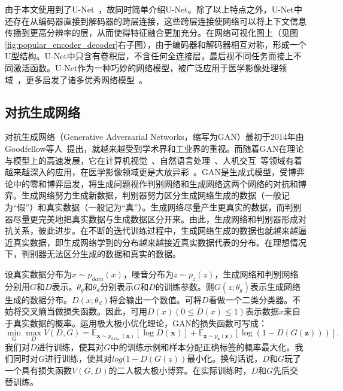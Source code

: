 由于本文使用到了U-Net~\cite{ronneberger2015u}，故同时简单介绍U-Net。除了以上特点之外，U-Net中还存在从编码器直接到解码器的跨层连接，这些跨层连接使网络可以将上下文信息传播到更高分辨率的层，从而使得特征融合更加充分。在网络可视化图上（见图\ref{fig:popular_encoder_decoder}右子图），由于编码器和解码器相互对称，形成一个U型结构。U-Net中只含有卷积层，不含任何全连接层，最后视不同任务而接上不同激活函数。U-Net作为一种巧妙的网络模型，被广泛应用于医学影像处理领域~\cite{cciccek20163d, han2018framing, dong2017automatic, sevastopolsky2017optic, zhang2018ct}，更多启发了诸多优秀网络模型~\cite{zhou2018unet++, oktay2018attention, ibtehaz2020multiresunet, alom2019recurrent, milletari2016v}。
\subsection{对抗生成网络}\label{subsec:gan_introduction}
对抗生成网络（Generative Adversarial Networks，缩写为GAN）最初于2014年由Goodfellow等人~\cite{goodfellow2014generative}提出，就越来越受到学术界和工业界的重视。而随着GAN在理论与模型上的高速发展，它在计算机视觉~\cite{zhu2017unpaired}、自然语言处理~\cite{qin2018dsgan}、人机交互~\cite{qiao2018emotional}等领域有着越来越深入的应用，在医学影像领域更是大放异彩~\cite{yang2017dagan, bhadra2020medical}。GAN是生成式模型，受博弈论中的零和博弈启发，将生成问题视作判别网络和生成网络这两个网络的对抗和博弈。生成网络努力生成新数据，判别器努力区分生成网络生成的数据（一般记为“假”）和真实数据（一般记为“真”）。生成网络尽量产生更真实的数据，而判别器尽量更完美地把真实数据与生成数据区分开来。由此，生成网络和判别器形成对抗关系，彼此进步。在不断的迭代训练过程中，生成网络生成的数据也就越来越逼近真实数据，即生成网络学到的分布越来越接近真实数据代表的分布。在理想情况下，判别器无法区分生成的数据和真实的数据。

设真实数据分布为$x\sim p_{data}(x)$，噪音分布为$z\sim p_z(z)$，生成网络和判别网络分别用$G$和$D$表示。$\theta_{g}$和$\theta_{d}$分别表示$G$和$D$的训练参数。则$G(z;\theta_{g})$表示生成网络生成的数据分布。$D(x;\theta_{d})$将会输出一个数值。可将$D$看做一个二类分类器。不妨将交叉熵当做损失函数。因此，可用$D(x)(0\leq D(x)\leq 1)$表示数据$x$来自于真实数据的概率。运用极大极小优化理论，GAN的损失函数可写成：
\begin{equation}\label{equ:gan_loss_func}
\min _{G} \max _{D} V(D, G)=\mathbb{E}_{\boldsymbol{x} \sim p_{\text {data }}(\boldsymbol{x})}[\log D(\boldsymbol{x})]+\mathbb{E}_{\boldsymbol{z} \sim p_{\boldsymbol{z}}(\boldsymbol{z})}[\log (1-D(G(\boldsymbol{z})))].
\end{equation}
我们对$D$进行训练，使其对$G$中的训练示例和样本分配正确标签的概率最大化。我们同时对$G$进行训练，使其对$log(1 - D(G(z))$最小化。换句话说，$D$和$G$玩了一个具有损失函数$V (G, D)$的二人极大极小博弈。在实际训练时，$D$和$G$先后交替训练。

